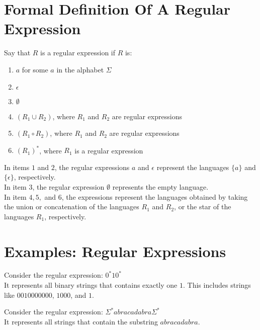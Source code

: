 \documentclass[11pt,a4paper]{article}
\begin{document}
\section{Formal Definition Of A Regular Expression}
\begin{definition}
    Say that $R$ is a regular expression if $R$ is:
    \begin{enumerate}
        \item $a$ for some $a$ in the alphabet $\Sigma$
        \item $\epsilon$
        \item $\emptyset$
        \item $(R_1\cup R_2)$, where $R_1$ and $R_2$ are regular expressions
        \item $(R_1\circ R_2)$, where $R_1$ and $R_2$ are regular expressions
        \item $(R_1)^*$, where $R_1$ is a regular expression
    \end{enumerate}

    In items $1$ and $2$, the regular expressions $a$ and $\epsilon$ represent the languages $\{a\}$ and $\{\epsilon\}$, respectively. \\

    In item 3, the regular expression $\emptyset$ represents the empty language. \\

    In item $4,5,$ and $6$, the expressions represent the languages obtained by taking the union or concatenation of the languages $R_1$ and $R_2$, or the star of the languages $R_1$, respectively. \\
\end{definition}

\section{Examples: Regular Expressions}
\begin{example}
    Consider the regular expression: $0^*10^*$ \\
    
    It represents all binary strings that contains exactly one $1$. This includes strings like $0010000000$, $1000$, and $1$.
\end{example}

\begin{example}
    Consider the regular expression: $\Sigma^* abracadabra\Sigma^*$ \\

    It represents all strings that contain the substring $abracadabra$.
\end{example}
\end{document}
